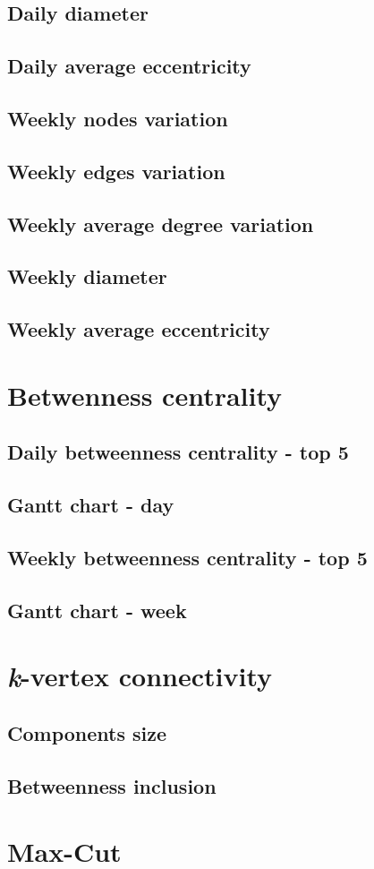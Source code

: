 	\subsection{Daily diameter}
	\subsection{Daily average eccentricity}
	\subsection{Weekly nodes variation}
	\subsection{Weekly edges variation}
	\subsection{Weekly average degree variation}
	\subsection{Weekly diameter}
	\subsection{Weekly average eccentricity}
	\section{Betwenness	 centrality}
	\subsection{Daily betweenness centrality - top 5}
	\subsection{Gantt chart - day}
	\subsection{Weekly betweenness centrality - top 5}
	\subsection{Gantt chart - week}
	\section{\textit{k}-vertex connectivity}
	\subsection{Components size}
	\subsection{Betweenness inclusion}
	\section{Max-Cut}
